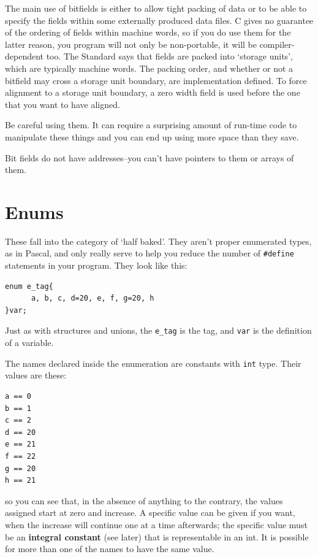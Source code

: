   The main use of bitfields is either to allow tight packing of data or to
   be able to specify the fields within some externally produced data files.
   C gives no guarantee of the ordering of fields within machine words, so if
   you do use them for the latter reason, you program will not only be
   non-portable, it will be compiler-dependent too. The Standard says that
   fields are packed into `storage units', which are typically machine
   words. The packing order, and whether or not a bitfield may cross a storage
   unit boundary, are implementation defined. To force alignment to a storage
   unit boundary, a zero width field is used before the one that you want to
   have aligned.


  Be careful using them. It can require a surprising amount of run-time code
   to manipulate these things and you can end up using more space than they
   save.


  Bit fields do not have addresses--you can't have pointers to them or
   arrays of them.


 
        \section{Enums}
        

  

  These fall into the category of `half baked'. They aren't proper
   enumerated types, as in Pascal, and only really serve to help you reduce the
   number of \texttt{\#define} statements in your program. They look like
   this:


  \begin{Verbatim}
enum e_tag{
      a, b, c, d=20, e, f, g=20, h
}var;
\end{Verbatim}

  Just as with structures and unions, the \texttt{e\_tag} is the tag, and
   \texttt{var} is the definition of a variable.


  The names declared inside the enumeration are constants with
   \texttt{int} type. Their values are these:


  \begin{Verbatim}
a == 0
b == 1
c == 2
d == 20
e == 21
f == 22
g == 20
h == 21
\end{Verbatim}

  so you can see that, in the absence of anything to the contrary, the
   values assigned start at zero and increase. A specific value can be given if
   you want, when the increase will continue one at a time afterwards; the
   specific value must be an \textbf{integral constant} (see later) that is
   representable in an int. It is possible for more than one of the names to
   have the same value.


